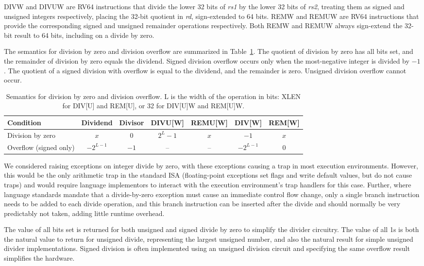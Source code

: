 DIVW and DIVUW are RV64 instructions that divide the
lower 32 bits of {\em rs1} by the lower 32 bits of {\em rs2}, treating
them as signed and unsigned integers respectively, placing the 32-bit
quotient in {\em rd}, sign-extended to 64 bits.  REMW and REMUW
are RV64 instructions that provide the corresponding
signed and unsigned remainder operations respectively. Both REMW and
REMUW always sign-extend the 32-bit result to 64 bits, including on a
divide by zero.

The semantics for division by zero and division overflow are summarized in
Table~\ref{tab:divby0}.  The quotient of division by zero has all bits set, and
the remainder of division by zero equals the dividend.  Signed division overflow
occurs only when the most-negative integer is divided by $-1$.  The quotient of
a signed division with overflow is equal to the dividend, and the remainder is
zero. Unsigned division overflow cannot occur.

\vspace{0.1in}
\begin{table}[h]
\center
\begin{tabular}{|l|c|c||c|c|c|c|}
\hline
Condition              & Dividend   & Divisor & DIVU[W]   & REMU[W] & DIV[W]     & REM[W] \\ \hline
Division by zero       & $x$        & 0       & $2^{L}-1$ & $x$     & $-1$       & $x$    \\
Overflow (signed only) & $-2^{L-1}$ & $-1$    & --        & --      & $-2^{L-1}$ & 0      \\
\hline
\end{tabular}
\caption{Semantics for division by zero and division overflow.
L is the width of the operation in bits: XLEN for DIV[U] and REM[U], or
32 for DIV[U]W and REM[U]W.}
\label{tab:divby0}
\end{table}

\begin{commentary}
We considered raising exceptions on integer divide by zero, with these
exceptions causing a trap in most execution environments.  However,
this would be the only arithmetic trap in the standard ISA
(floating-point exceptions set flags and write default values, but do
not cause traps) and would require language implementors to interact
with the execution environment's trap handlers for this case.
Further, where language standards mandate that a divide-by-zero
exception must cause an immediate control flow change, only a single
branch instruction needs to be added to each divide operation, and
this branch instruction can be inserted after the divide and should
normally be very predictably not taken, adding little runtime
overhead.

The value of all bits set is returned for both unsigned and signed
divide by zero to simplify the divider circuitry.  The value of all 1s
is both the natural value to return for unsigned divide, representing
the largest unsigned number, and also the natural result for simple
unsigned divider implementations.  Signed division is often
implemented using an unsigned division circuit and specifying the same
overflow result simplifies the hardware.
\end{commentary}
